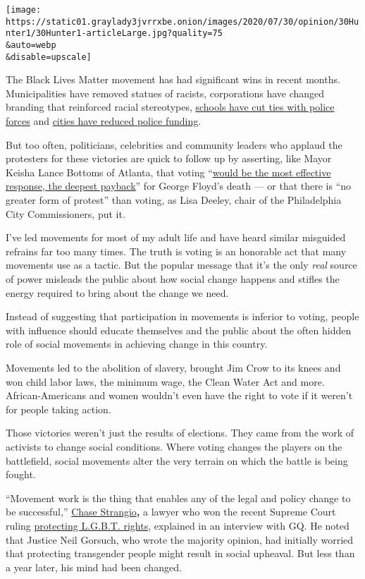 \texttt{[image: https://static01.graylady3jvrrxbe.onion/images/2020/07/30/opinion/30Hunter1/30Hunter1-articleLarge.jpg?quality=75\\\&auto=webp\\\&disable=upscale]}

The Black Lives Matter movement has had significant wins in recent
months. Municipalities have removed statues of racists, corporations
have changed branding that reinforced racial stereotypes,
\href{https://www.nytimes3xbfgragh.onion/2020/06/12/us/schools-police-resource-officers.html}{schools
have cut ties with police forces} and
\href{https://www.nytimes3xbfgragh.onion/2020/06/08/us/unrest-defund-police.html}{cities
have reduced police funding}.

But too often, politicians, celebrities and community leaders who
applaud the protesters for these victories are quick to follow up by
asserting, like Mayor Keisha Lance Bottoms of Atlanta, that voting
``\href{https://www.nytimes3xbfgragh.onion/2020/06/03/opinion/police-protests-atlanta-keisha-bottoms.html}{would
be the most effective response, the deepest payback}'' for George
Floyd's death --- or that there is ``no greater form of protest'' than
voting, as Lisa Deeley, chair of the Philadelphia City Commissioners,
put it.

I've led movements for most of my adult life and have heard similar
misguided refrains far too many times. The truth is voting is an
honorable act that many movements use as a tactic. But the popular
message that it's the only \emph{real} source of power misleads the
public about how social change happens and stifles the energy required
to bring about the change we need.

Instead of suggesting that participation in movements is inferior to
voting, people with influence should educate themselves and the public
about the often hidden role of social movements in achieving change in
this country.

Movements led to the abolition of slavery, brought Jim Crow to its knees
and won child labor laws, the minimum wage, the Clean Water Act and
more. African-Americans and women wouldn't even have the right to vote
if it weren't for people taking action.

Those victories weren't just the results of elections. They came from
the work of activists to change social conditions. Where voting changes
the players on the battlefield, social movements alter the very terrain
on which the battle is being fought.

``Movement work is the thing that enables any of the legal and policy
change to be successful,''
\href{https://www.gq.com/story/chase-strangio-aclu-lgbtq-legal-victory}{Chase
Strangio}\textbf{,} a lawyer who won the recent Supreme Court ruling
\href{https://www.nytimes3xbfgragh.onion/2020/06/15/us/gay-transgender-workers-supreme-court.html}{protecting
L.G.B.T. rights}, explained in an interview with GQ. He noted that
Justice Neil Gorsuch, who wrote the majority opinion, had initially
worried that protecting transgender people might result in social
upheaval. But less than a year later, his mind had been changed.

